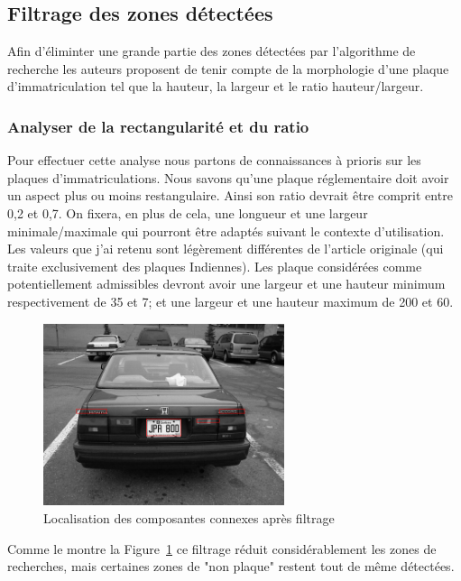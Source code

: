 \documentclass[a4paper,10pt,twocolumn]{article}
\begin{document}
\subsection{Filtrage des zones détectées}
Afin d'éliminter une grande partie des zones détectées par l'algorithme de recherche les auteurs proposent de tenir compte de la morphologie d'une plaque d'immatriculation tel que la hauteur, la largeur et le ratio hauteur/largeur.

\subsubsection{Analyser de la rectangularité et du ratio} 
Pour effectuer cette analyse nous partons de connaissances à prioris sur les plaques d'immatriculations. Nous savons qu'une plaque réglementaire doit avoir un aspect plus ou moins restangulaire. Ainsi son ratio devrait être comprit entre 0,2 et 0,7. On fixera, en plus de cela, une longueur et une largeur minimale/maximale qui pourront être adaptés suivant le contexte d'utilisation. Les valeurs que j'ai retenu sont légèrement différentes de l'article originale (qui traite exclusivement des plaques Indiennes). Les plaque considérées comme potentiellement admissibles devront avoir une largeur et une hauteur minimum respectivement de 35 et 7; et une largeur et une hauteur maximum de 200 et 60.
\begin{figure}[H]
	\centering 
	  \includegraphics[width=200pt]{img/991213-006_detect_2.png}
	\caption{Localisation des composantes connexes après filtrage\label{connexes_2}}
\end{figure}
Comme le montre la Figure~\ref{connexes_2} ce filtrage réduit considérablement les zones de recherches, mais certaines zones de "non plaque" restent tout de même détectées.
\end{document}
